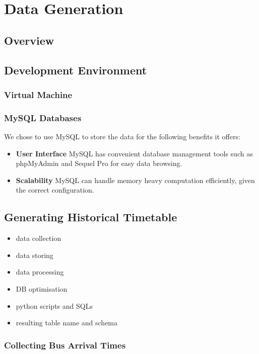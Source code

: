 \chapter{Data Generation}
\label{ch:data_generation}
\section{Overview}


\section{Development Environment}
\subsection{Virtual Machine}

\subsection{MySQL Databases}
\par We chose to use MySQL to store the data for the following benefits it offers:

\begin{itemize}
  \item \textbf{User Interface} MySQL has convenient database management tools such as phpMyAdmin\cite{phpmyadmin} and Sequel Pro\cite{sequel_pro} for easy data browsing.
  \item \textbf{Scalability} MySQL can handle memory heavy computation efficiently, given the correct configuration.
\end{itemize}

\section{Generating Historical Timetable}
\begin{itemize}
  \item data collection
  \item data storing
  \item data processing
  \item DB optimisation
  \item python scripts and SQLs
  \item resulting table name and schema
\end{itemize}

\subsection{Collecting Bus Arrival Times}
\label{sec:collecting_arrival_times}

